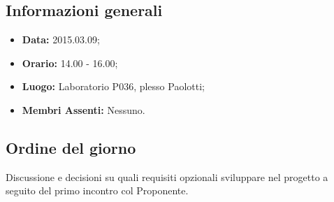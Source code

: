 \subsection{Informazioni generali}
\begin{itemize}
	\item \textbf{Data:} 2015.03.09;
	\item \textbf{Orario:} 14.00 - 16.00;
	\item \textbf{Luogo:} Laboratorio P036, plesso Paolotti;
	\item \textbf{Membri Assenti:} Nessuno.
\end{itemize}

\subsection{Ordine del giorno}
Discussione e decisioni su quali requisiti opzionali sviluppare nel progetto \PROGETTO{} a seguito del primo incontro col Proponente.

